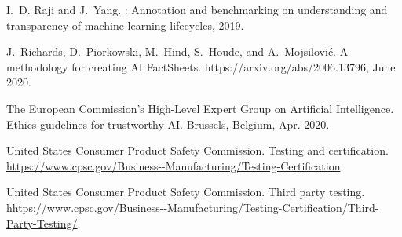 \documentclass[11pt,dvipdfm]{article}
\begin{document}
\begin{thebibliography}{10}
I.~D. Raji and J.~Yang.
: Annotation and benchmarking on understanding and
  transparency of machine learning lifecycles, 2019.

J.~Richards, D.~Piorkowski, M.~Hind, S.~Houde, and A.~Mojsilović.
\newblock A methodology for creating {AI FactSheets}.
\newblock https://arxiv.org/abs/2006.13796, June 2020.

{The European Commission's High-Level Expert Group on Artificial Intelligence}.
\newblock Ethics guidelines for trustworthy {AI}.
\newblock Brussels, Belgium, Apr. 2020.

{United States Consumer Product Safety Commission}.
\newblock Testing and certification.
\newblock
  \url{https://www.cpsc.gov/Business--Manufacturing/Testing-Certification}.

{United States Consumer Product Safety Commission}.
\newblock Third party testing.
\newblock
  \url{hhtps://www.cpsc.gov/Business--Manufacturing/Testing-Certification/Third-Party-Testing/}.

\end{thebibliography}
\end{document}
